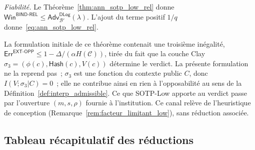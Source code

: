 \begin{sloppypar}
\begin{Preuve}
\emph{Fiabilit\'e.} Le Th\'eor\`eme~\ref{thm:ann_sotp_low_rel} donne
$\mathsf{Win}^{\mathsf{BIND\text{-}REL}} \leq \mathsf{Adv}^{\mathsf{DLog}}_{\mathcal{B}'}(\lambda)$.
L'ajout du terme positif $1/q$ donne~\eqref{eq:ann_sotp_low_rel}.
\end{Preuve}

\begin{remark}
\label{rem:ann_sotp_low_opp_statut}
La formulation initiale de ce th\'eor\`eme contenait une troisi\`eme in\'egalit\'e,
$\mathsf{Err}^{\mathsf{EXT\text{-}OPP}} \leq 1 - \Delta/(\alpha H(\mathcal{C}))$,
tir\'ee du fait que la couche Clay $\sigma_3 = (\phi(c), \mathsf{Hash}(c), V(c))$ d\'etermine
le verdict. La pr\'esente formulation ne la reprend pas~; $\sigma_3$ est une fonction du
contexte public $C$, donc $I(V;\sigma_3|C) = 0$~; elle ne contribue ainsi en rien \`a
l'opposabilit\'e au sens de la D\'efinition~\ref{def:interp_admissible}. Ce que
SOTP-Low apporte au verdict passe par l'ouverture $(m,s,\rho)$ fournie \`a
l'institution. Ce canal rel\`eve de l'heuristique de conception
(Remarque~\ref{rem:facteur_limitant_low}), sans r\'eduction associ\'ee.
\end{remark}

\subsection{Tableau r\'ecapitulatif des r\'eductions}


\end{sloppypar}
